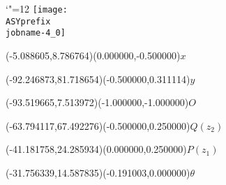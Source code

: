 \setlength{\unitlength}{1pt}%
\makeatletter%
\let\ASYencoding\f@encoding%
\let\ASYfamily\f@family%
\let\ASYseries\f@series%
\let\ASYshape\f@shape%
\makeatother%
{\catcode`"=12%
\texttt{[image: \\ASYprefix\\jobname-4\_0]}%
}%
%
\fontsize{6.000000}{7.200000}\selectfont%
\usefont{\ASYencoding}{\ASYfamily}{\ASYseries}{\ASYshape}%
\ASYalign(-5.088605,8.786764)(0.000000,-0.500000){$x$}%
%
\fontsize{6.000000}{7.200000}\selectfont%
\ASYalign(-92.246873,81.718654)(-0.500000,0.311114){$y$}%
%
\fontsize{6.000000}{7.200000}\selectfont%
\ASYalign(-93.519665,7.513972)(-1.000000,-1.000000){$O$}%
%
\fontsize{6.000000}{7.200000}\selectfont%
\ASYalign(-63.794117,67.492276)(-0.500000,0.250000){$Q(z_2)$}%
%
\fontsize{6.000000}{7.200000}\selectfont%
\ASYalign(-41.181758,24.285934)(0.000000,0.250000){$P(z_1)$}%
%
\fontsize{6.000000}{7.200000}\selectfont%
\ASYalign(-31.756339,14.587835)(-0.191003,0.000000){$\theta$}%
